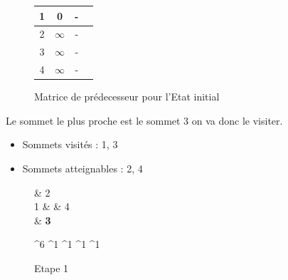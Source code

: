 \documentclass[a4paper,12pt,final] {article}
\begin{document}
\begin{figure}[H]
\begin{center}
\begin{tabular}{|c|c|c|c|}
\hline
 {\color{red} \bf 1} & 0 & - \\
\hline
2 & $\infty$ & - \\
\hline
3 & $\infty$ & - \\
\hline
4 & $\infty$ & - \\
\hline
\end{tabular}
\end{center}
\caption{Matrice de prédecesseur pour l'Etat initial}
\end{figure}
Le sommet le plus proche est le sommet 3 on va donc le visiter.
\begin{itemize}
\item Sommets visités : 1, 3
\item Sommets atteignables : 2, 4
\end{itemize}
\begin{figure}[H]
 \centering
 \begin{psmatrix}[mnode=circle]
	    & 2\\
	1 &    & 4\\
	    &  {\color{red} \bf 3}\\
\end{psmatrix}
	
	^{6}
	^{1}
	^{1}
	^{1}
	^{1}

  \caption{Etape 1}
\end{figure}
\end{document}
